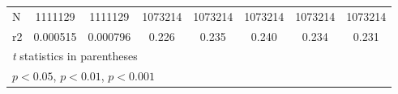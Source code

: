 {\begin{tabular}{l*{7}{c}}
N                   &     1111129         &     1111129         &     1073214         &     1073214         &     1073214         &     1073214         &     1073214         \\
r2                  &    0.000515         &    0.000796         &       0.226         &       0.235         &       0.240         &       0.234         &       0.231         \\
\hline\hline
\multicolumn{8}{l}{\footnotesize \textit{t} statistics in parentheses}\\
\multicolumn{8}{l}{\footnotesize \sym{*} \(p<0.05\), \sym{**} \(p<0.01\), \sym{***} \(p<0.001\)}\\
\end{tabular}
}
